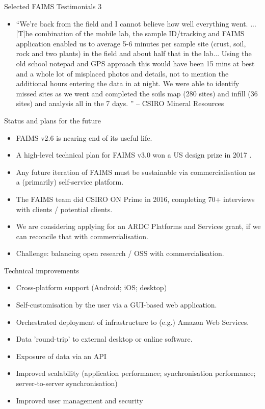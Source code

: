 \documentclass[aspectratio=169, 12pt]{beamer} %
\begin{document}
\begin{frame}{Selected FAIMS Testimonials 3}
    \begin{itemize}[label=\textbullet]
\item 
``We’re back from the field and I cannot believe how well everything went. ... [T]he combination of the mobile lab, the sample ID/tracking and FAIMS application enabled us to average 5-6 minutes per sample site (crust, soil, rock and two plants)  in the field and about half that in the lab... Using the old school notepad and GPS approach this would have been 15 mins at best and a whole lot of misplaced photos and details, not to mention the additional hours entering the data in at night. We were able to identify missed sites as we went and completed the soils map (280 sites) and infill (36 sites) and analysis all in the 7 days. '' -- CSIRO Mineral Resources
\end{itemize}
\end{frame}

\begin{frame}{Status and plans for the future}
    \begin{itemize}[label=\textbullet]
        \item FAIMS v2.6 is nearing end of its useful life.
        \item A high-level technical plan for FAIMS v3.0 won a US design prize in 2017 \cite{Bureau_of_Reclamation2017-xl}.
        \item Any future iteration of FAIMS must be sustainable via commercialisation as a (primarily) self-service platform.
        \item The FAIMS team did CSIRO ON Prime in 2016, completing 70+ interviews with clients / potential clients.
        \item We are considering applying for an ARDC Platforms and Services grant, if we can reconcile that with commercialisation.
        \item Challenge: balancing open research / OSS with commercialisation.
    \end{itemize}
\end{frame}

\begin{frame}{Technical improvements}
    \begin{itemize}[label=\textbullet]
        \item Cross-platform support (Android; iOS; desktop)
        \item Self-customisation by the user via a GUI-based web application.
        \item Orchestrated deployment of infrastructure to (e.g.) Amazon Web Services.
        \item Data 'round-trip' to external desktop or online software.
        \item Exposure of data via an API
        \item Improved scalability (application performance; synchronisation performance; server-to-server synchronisation)
        \item Improved user management and security
    \end{itemize}
\end{frame}
\end{document}
